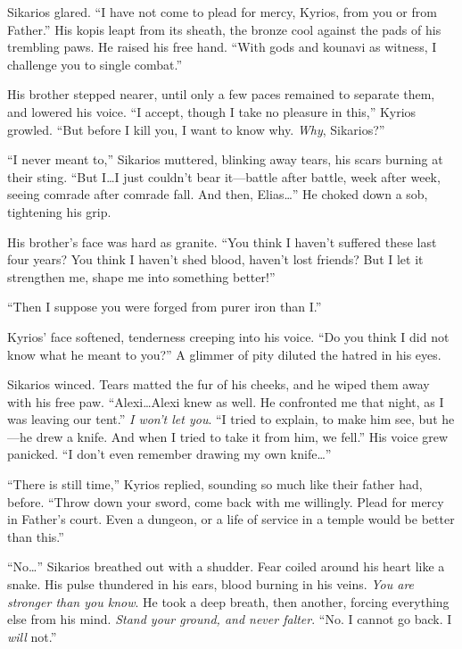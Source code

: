 Sikarios glared. ``I have not come to plead for mercy, Kyrios, from you or from Father.'' His kopis leapt from its sheath, the bronze cool against the pads of his trembling paws. He raised his free hand. ``With gods and kounavi as witness, I challenge you to single combat.''

His brother stepped nearer, until only a few paces remained to separate them, and lowered his voice. ``I accept, though I take no pleasure in this,'' Kyrios growled. ``But before I kill you, I want to know why. \emph{Why}, Sikarios?''

``I never meant to,'' Sikarios muttered, blinking away tears, his scars burning at their sting. ``But I\ldots{}I just couldn't bear it---battle after battle, week after week, seeing comrade after comrade fall. And then, Elias\ldots'' He choked down a sob, tightening his grip.

His brother's face was hard as granite. ``You think I haven't suffered these last four years? You think I haven't shed blood, haven't lost friends? But I let it strengthen me, shape me into something better!''

``Then I suppose you were forged from purer iron than I.''

Kyrios' face softened, tenderness creeping into his voice. ``Do you think I did not know what he meant to you?'' A glimmer of pity diluted the hatred in his eyes.

Sikarios winced. Tears matted the fur of his cheeks, and he wiped them away with his free paw. ``Alexi\ldots{}Alexi knew as well. He confronted me that night, as I was leaving our tent.'' \emph{I won't let you}. ``I tried to explain, to make him see, but he---he drew a knife. And when I tried to take it from him, we fell.'' His voice grew panicked. ``I don't even remember drawing my own knife\ldots''

``There is still time,'' Kyrios replied, sounding so much like their father had, before. ``Throw down your sword, come back with me willingly. Plead for mercy in Father's court. Even a dungeon, or a life of service in a temple would be better than this.''

``No\ldots'' Sikarios breathed out with a shudder. Fear coiled around his heart like a snake. His pulse thundered in his ears, blood burning in his veins. \emph{You are stronger than you know}. He took a deep breath, then another, forcing everything else from his mind. \emph{Stand your ground, and never falter}. ``No. I cannot go back. I \emph{will} not.''

